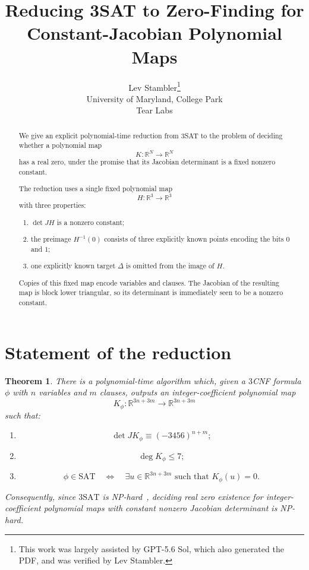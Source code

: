 \documentclass[11pt]{article}
\title{Reducing \textsc{3SAT} to Zero-Finding for Constant-Jacobian Polynomial Maps}
\author{Lev Stambler\thanks{This work was largely assisted by GPT-5.6 Sol,
which also generated the PDF, and was verified by Lev Stambler.}\\
\small University of Maryland, College Park\\
\small Tear Labs}
\date{}
\newtheorem{theorem}{Theorem}
\newcommand{\R}{\mathbb{R}}
\begin{document}
\maketitle

\begin{abstract}
We give an explicit polynomial-time reduction from \textsc{3SAT} to the
problem of deciding whether a polynomial map
\[
K:\R^N\longrightarrow\R^N
\]
has a real zero, under the promise that its Jacobian determinant is a fixed
nonzero constant.

The reduction uses a single fixed polynomial map
\[
H:\R^3\longrightarrow\R^3
\]
with three properties:
\begin{enumerate}
\item $\det JH$ is a nonzero constant;
\item the preimage $H^{-1}(0)$ consists of three explicitly known points
encoding the bits $0$ and $1$;
\item one explicitly known target $\Delta$ is omitted from the image of
$H$.
\end{enumerate}
Copies of this fixed map encode variables and clauses. The Jacobian of the
resulting map is block lower triangular, so its determinant is immediately
seen to be a nonzero constant.
\end{abstract}

\section{Statement of the reduction}

\begin{theorem}
There is a polynomial-time algorithm which, given a $3$CNF formula
$\phi$ with $n$ variables and $m$ clauses, outputs an integer-coefficient
polynomial map
\[
K_\phi:\R^{3n+3m}\longrightarrow\R^{3n+3m}
\]
such that:
\begin{enumerate}
\item
\[
\det JK_\phi\equiv (-3456)^{n+m};
\]
\item
\[
\deg K_\phi\leq 7;
\]
\item
\[
\phi\in\mathrm{SAT}
\quad\Longleftrightarrow\quad
\exists u\in\R^{3n+3m}\text{ such that }K_\phi(u)=0.
\]
\end{enumerate}
Consequently, since $3\mathrm{SAT}$ is NP-hard~\cite{Karp1972}, deciding real
zero existence for integer-coefficient polynomial maps with constant nonzero
Jacobian determinant is NP-hard.
\end{theorem}
\end{document}
